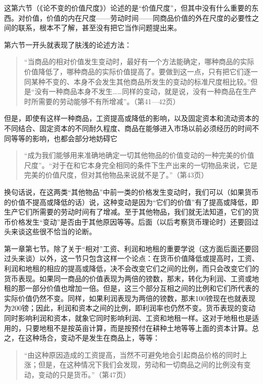 这第六节（《论不变的价值尺度》）论述的是“价值尺度”，但其中没有什么重要的东西。对价值，价值的内在尺度——劳动时间——同商品价值的外在尺度的必要性之间的联系，根本不了解，甚至没有把它当作问题提出来。

第六节一开头就表现了肤浅的论述方法：

\begin{quote}{“当商品的相对价值发生变动时，最好有一个方法能确定，哪种商品的实际价值降低了，哪种商品的实际价值提高了。要做到这一点，只有把它们逐一同某种不变的、本身不会发生其他商品所发生的变动的标准尺度相比较。”但是“没有一种商品本身不发生……同样的变动，就是说，没有一种商品在生产时所需要的劳动能够不有所增减”。（第41—42页）}\end{quote}

但是，即使有这样一种商品，工资提高或降低的影响，以及固定资本和流动资本的不同结合、固定资本的不同耐久程度、商品在能够进入市场以前必须经历的时间不同等等的影响，也都会部分地妨碍它

\begin{quote}{“成为我们能够用来准确地确定一切其他物品的价值变动的一种完美的价值尺度”。“对于在和它本身完全相同的条件下生产出来的一切物品来说，它是完美的价值尺度，但对其他物品来说就不是了。”（第43页）}\end{quote}

换句话说，在这两类“其他物品”中前一类的价格发生变动时，我们可以（如果货币的价值不提高或降低的话）说，这种变动是因为“它们的价值”有了提高或降低，即生产它们所需要的劳动时间有了增减。至于其他物品，我们就无法知道，它们的货币价格发生“变动”是否由于其他原因等等。后面（以后考察货币理论时）还要回过头来谈这些很不恰当的论断。

第一章第七节。除了关于“相对”工资、利润和地租的重要学说（这方面后面还要回过头来谈）以外，这一节只包含这样一个论点：在货币价值降低或提高时，工资、利润和地租的相应的提高或降低，决不会改变它们之间的比例，而只会改变它们的货币表现。如果同一商品的价值表现为两倍的镑数，那末，转化为利润、工资或地租的那一部分价值也增加一倍。但是，这三个部分互相之间的比例和它们所代表的实际价值仍然不变。同样，如果利润表现为两倍的镑数，那末100镑现在也就表现为200镑；因此，利润和资本之间的比例，即利润率也仍然不变。货币表现的变动同时影响利润和资本，就象它同时影响利润、工资和地租一样。这对于地租也是适用的，只要地租不是按英亩计算，而是按预付在耕种土地等等上面的资本计算。总之，在这种场合，变动不是发生在商品上，等等：

\begin{quote}{“由这种原因造成的工资提高，当然不可避免地会引起商品价格的同时上涨；但是，在这种情况下我们会发现，劳动和一切商品之间的比例没有变动，变动的只是货币。”（第47页）}\end{quote}


